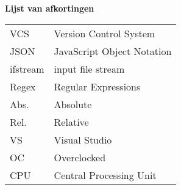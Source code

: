 \Large
\textbf{Lijst van afkortingen}
\newline
\small
\begin{table}[ht]
\small
\begin{tabular}{ll} 
VCS         & Version Control System \\
JSON        & JavaScript Object Notation \\
ifstream    & input file stream \\
Regex       & Regular Expressions \\
Abs.        & Absolute \\
Rel.        & Relative \\
VS          & Visual Studio \\
OC          & Overclocked \\
CPU         & Central Processing Unit \\
\end{tabular}
\end{table}

\newpage
